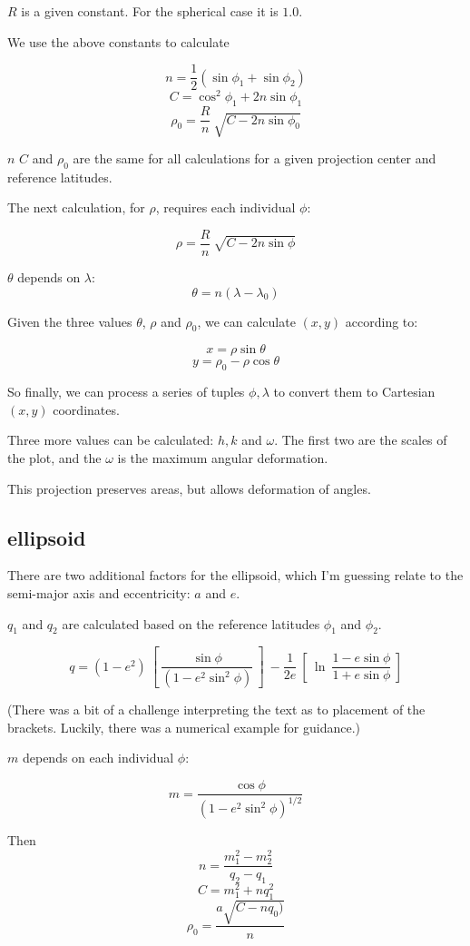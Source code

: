 \documentclass[11pt, oneside]{article}
\begin{document}
$R$ is a given constant.  For the spherical case it is $1.0$.

We use the above constants to calculate 

\[ n = \frac{1}{2}(\sin \phi_1 + \sin \phi_2) \]
\[ C = \cos^2 \phi_1 + 2n \sin \phi_1 \]
\[ \rho_0 =  \frac{R}{n} \ \sqrt{C - 2n \sin \phi_0} \]

$n$ $C$ and $\rho_0$ are the same for all calculations for a given projection center and reference latitudes.

The next calculation, for $\rho$, requires each individual $\phi$:

\[ \rho = \frac{R}{n} \ \sqrt{C - 2n \sin \phi} \]

$\theta$ depends on $\lambda$:
\[ \theta = n(\lambda - \lambda_0) \]

Given the three values $\theta$, $\rho$ and $\rho_0$, we can calculate $(x,y)$ according to:

\[ x = \rho \sin \theta \]
\[ y = \rho_0 - \rho \cos \theta \]

So finally, we can process a series of tuples $\phi, \lambda$ to convert them to Cartesian $(x,y)$ coordinates.

Three more values can be calculated:  $h, k$ and $\omega$.  The first two are the scales of the plot, and the $\omega$ is the maximum angular deformation.

This projection preserves areas, but allows deformation of angles.

\subsection*{ellipsoid}

There are two additional factors for the ellipsoid, which I'm guessing relate to the semi-major axis and eccentricity:   $a$ and $e$.

$q_1$ and $q_2$ are calculated based on the reference latitudes $\phi_1$ and $\phi_2$.

\[ q = (1-e^2) \ [ \  \frac{\sin \phi}{(1- e^2 \sin^2 \phi)} \ ] \ - \frac{1}{2e} \ [ \ \ln \ \frac{1 - e \sin \phi}{1 + e \sin \phi} \ ] \]

(There was a bit of a challenge interpreting the text as to placement of the brackets.  Luckily, there was a numerical example for guidance.)

$m$ depends on each individual $\phi$:

\[ m = \frac{\cos \phi}{(1 - e^2 \sin^2 \phi)^{1/2}} \]

Then
\[ n = \frac{m_1^2 - m_2^2}{q_2 - q_1} \]
\[ C = m_1^2 + nq_1^2 \]
\[ \rho_0 = \frac{a \sqrt{C - nq_0)} }{n} \]
\end{document}
